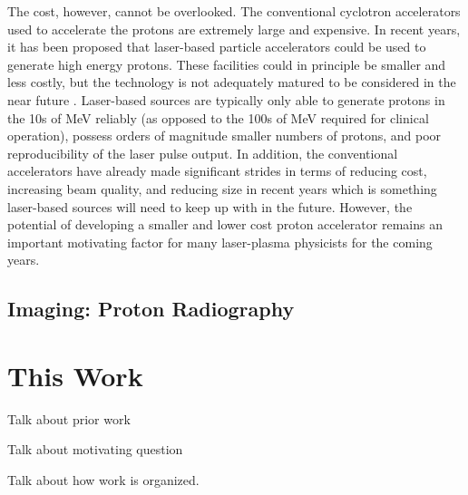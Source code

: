 The cost, however, cannot be overlooked. The conventional cyclotron accelerators used to accelerate the protons are extremely large and expensive. In recent years, it has been proposed that laser-based particle accelerators could be used to generate high energy protons. These facilities could in principle be smaller and less costly, but the technology is not adequately matured to be considered in the near future \cite{Linz_2016_LaPB}. Laser-based sources are typically only able to generate protons in the 10s of MeV reliably (as opposed to the 100s of MeV required for clinical operation), possess orders of magnitude smaller numbers of protons, and poor reproducibility of the laser pulse output. In addition, the conventional accelerators have already made significant strides in terms of reducing cost, increasing beam quality, and reducing size in recent years \cite{Linz_2016_LaPB} which is something laser-based sources will need to keep up with in the future. However, the potential of developing a smaller and lower cost proton accelerator remains an important motivating factor for many laser-plasma physicists for the coming years.

\subsection{Imaging: Proton Radiography}



\section{This Work}


Talk about prior work 


Talk about motivating question 


Talk about how work is organized. 



